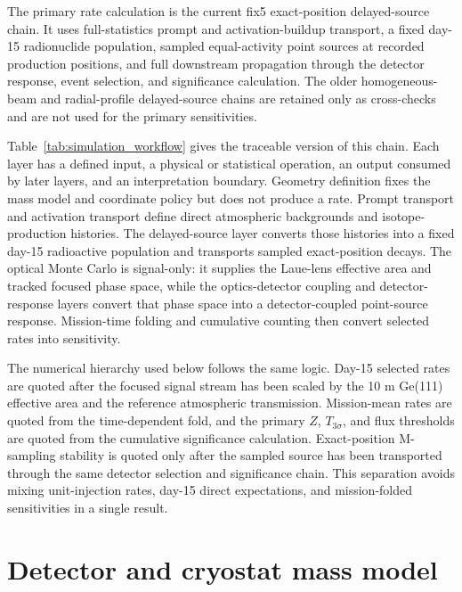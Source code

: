 \documentclass[preprint,12pt]{elsarticle}
\begin{document}
The primary rate calculation is the current fix5 exact-position delayed-source chain. It uses full-statistics prompt and activation-buildup transport, a fixed day-15 radionuclide population, sampled equal-activity point sources at recorded production positions, and full downstream propagation through the detector response, event selection, and significance calculation. The older homogeneous-beam and radial-profile delayed-source chains are retained only as cross-checks and are not used for the primary sensitivities.

Table~\ref{tab:simulation_workflow} gives the traceable version of this chain. Each layer has a defined input, a physical or statistical operation, an output consumed by later layers, and an interpretation boundary. Geometry definition fixes the mass model and coordinate policy but does not produce a rate. Prompt transport and activation transport define direct atmospheric backgrounds and isotope-production histories. The delayed-source layer converts those histories into a fixed day-15 radioactive population and transports sampled exact-position decays. The optical Monte Carlo is signal-only: it supplies the Laue-lens effective area and tracked focused phase space, while the optics-detector coupling and detector-response layers convert that phase space into a detector-coupled point-source response. Mission-time folding and cumulative counting then convert selected rates into sensitivity.

The numerical hierarchy used below follows the same logic. Day-15 selected
rates are quoted after the focused signal stream has been scaled by the 10 m
Ge(111) effective area and the reference atmospheric transmission.
Mission-mean rates are quoted from the time-dependent fold, and the primary
$Z$, $T_{3\sigma}$, and flux thresholds are quoted from the cumulative
significance calculation. Exact-position M-sampling stability is quoted only
after the sampled source has been transported through the same detector
selection and significance chain. This separation avoids mixing unit-injection
rates, day-15 direct expectations, and mission-folded sensitivities in a single
result.



\clearpage

\section{Detector and cryostat mass model}
\label{sec:geometry}
\end{document}

